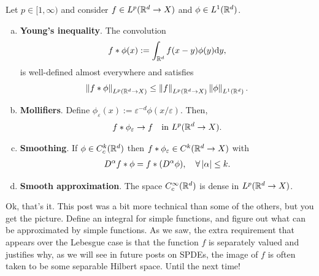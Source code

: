 \documentclass[
    a4paper,
    DIV=14,
    abstract=true,
    numbers=noenddot
]{scrartcl}
\begin{document}
\begin{theorem}\label{thm:approx}
	Let $p \in [1,\infty)$ and consider $f\in L^p(\mathbb{R}^d\to X)$ and $\phi \in L^1(\mathbb{R}^d)$.
	\begin{enumerate}[a)]
		\item \textbf{Young's inequality}. The convolution
		      \begin{align*}
			      f*\phi(x):=\int_{\mathbb{R}^d} f(x-y)\phi(y)\mathrm{d} y,
		      \end{align*}
		      is well-defined almost everywhere and satisfies
		      \begin{align*}
			      \left\lVert f*\phi \right\rVert_{L^p(\mathbb{R}^d\to X)}\leq \left\lVert f \right\rVert_{L^p(\mathbb{R}^d\to X)}\left\lVert \phi \right\rVert_{L^1(\mathbb{R}^d)}.
		      \end{align*}
		\item \textbf{Mollifiers}. Define $\phi_\varepsilon(x):=\varepsilon^{-d}\phi(x/\varepsilon)$. Then,
		      \begin{align*}
			      f*\phi_\varepsilon \to f \quad \text{in } L^p(\mathbb{R}^d\to X).
		      \end{align*}
		\item \textbf{Smoothing}. If $\phi \in C^k_c(\mathbb{R}^d)$ then $f*\phi_\varepsilon \in C^k(\mathbb{R}^d\to X)$ with
		      \begin{align*}
			      D^\alpha f*\phi=f*(D^\alpha \phi), \quad\forall \left| \alpha \right|\leq k.
		      \end{align*}
		\item \textbf{Smooth approximation}. The space $C_c^\infty(\mathbb{R}^d)$ is dense in $L^p(\mathbb{R}^d\to X)$.
	\end{enumerate}
\end{theorem}






Ok, that's it. This post was a bit more technical than some of the others, but you get the picture. Define an integral for simple functions, and figure out what can be approximated by simple functions. As we saw, the extra requirement that appears over the Lebesgue case is that the function $f$ is separately valued and justifies why, as we will see in future posts on SPDEs, the image of $f$ is often taken to be some separable Hilbert space. Until the next time!


\end{document}
